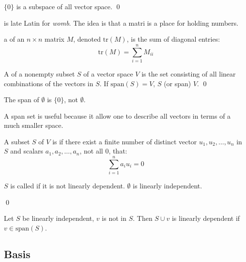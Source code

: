 \begin{theorem}
    $\{0\}$ is a subspace of all vector space. 
    \qed
\end{theorem}

 is late Latin for \emph{womb}. The idea is that a matri is a place for holding numbers.


\begin{definition}
	a  of an $n \times n$ matrix $M$, denoted $\text{tr}(M)$, is the sum of diagonal entries:
	\begin{equation}
		\text{tr}(M) = \sum_{i=1}^n M_{ii}
	\end{equation}
\end{definition}

\begin{definition}
	A  of a nonempty subset $S$ of a vector space $V$ is the set consisting of all linear combinations of the vectors in $S$. If $\text{span}(S) =V$, $S$  (or span) $V$.
	\qed
\end{definition}

\begin{definition}
    The span of $\emptyset$ is $\{0\}$, not $\emptyset$.
\end{definition}

A span set is useful because it allow one to describe all vectors in terms of a much smaller space.

\begin{definition}
	A subset $S$ of $V$ is  if there exist a finite number of distinct vector $u_1, u_2, \dots, u_n$ in $S$ and scalars $a_1, a_2, \dots, a_n$, not all $0$, that:
	\begin{equation}
		\sum_{i=1}^n a_i u_i = 0
	\end{equation}
	
	$S$ is called  if it is not linearly dependent. $\emptyset$ is linearly independent.
	
	\qed
\end{definition}

\begin{theorem}
	Let $S$ be linearly independent, $v$ is not in $S$. Then $S \cup {v} $ is linearly dependent if $v \in \text{span}(S)$.
\end{theorem}



\subsection{Basis}

